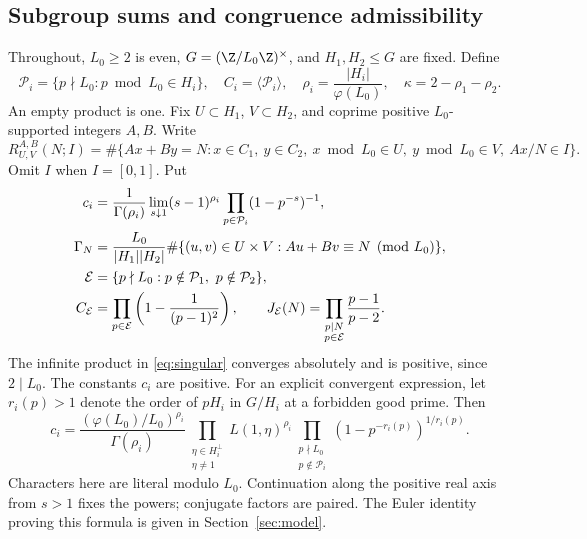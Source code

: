 \subsection{Subgroup sums and congruence admissibility}
Throughout, \(L_0\ge2\) is even,
\(G=(\Z/L_0\Z)^\times\), and \(H_1,H_2\le G\) are fixed.
Define
\[
 \mathcal P_i=\{p\nmid L_0:p\bmod L_0\in H_i\},\quad
 C_i=\langle\mathcal P_i\rangle,\quad
 \rho_i=\frac{|H_i|}{\varphi(L_0)},\quad
 \kappa=2-\rho_1-\rho_2.
\]
An empty product is one. Fix \(U\subset H_1\), \(V\subset H_2\),
and coprime positive \(L_0\)-supported integers \(A,B\).
Write
\[
 R_{U,V}^{A,B}(N;I)=\#\{Ax+By=N:x\in C_1,\ y\in C_2,
      \ x\bmod L_0\in U,\ y\bmod L_0\in V,\ Ax/N\in I\}.
\]
Omit \(I\) when \(I=[0,1]\). Put
\begin{align}
 c_i&=\frac{1}{\Gamma(\rho_i)}
    \lim_{s\downarrow1}(s-1)^{\rho_i}
              \prod_{p\in\mathcal P_i}(1-p^{-s})^{-1},\label{eq:marginal}\\
 \Gamma_N&=\frac{L_0}{|H_1||H_2|}
    \#\{(u,v)\in U\times V:Au+Bv\equiv N\pmod{L_0}\},\label{eq:finite}\\
 \mathcal E&=\{p\nmid L_0:p\notin\mathcal P_1,
                                  \ p\notin\mathcal P_2\},\notag\\
 C_{\mathcal E}&=\prod_{p\in\mathcal E}
               \left(1-\frac{1}{(p-1)^2}\right),\qquad
 J_{\mathcal E}(N)=\prod_{\substack{p\mid N\\p\in\mathcal E}}
                              \frac{p-1}{p-2}.\label{eq:singular}
\end{align}
The infinite product in \eqref{eq:singular} converges absolutely and
is positive, since \(2\mid L_0\). The constants \(c_i\) are positive.
For an explicit convergent expression, let \(r_i(p)>1\) denote the
order of \(pH_i\) in \(G/H_i\) at a forbidden good prime. Then
\begin{equation}\label{eq:marginal-product}
 c_i=\frac{(\varphi(L_0)/L_0)^{\rho_i}}{\Gamma(\rho_i)}
 \prod_{\substack{\eta\in H_i^\perp\\\eta\ne1}}L(1,\eta)^{\rho_i}
 \prod_{\substack{p\nmid L_0\\p\notin\mathcal P_i}}
                     (1-p^{-r_i(p)})^{1/r_i(p)}.
\end{equation}
Characters here are literal modulo \(L_0\). Continuation along the
positive real axis from \(s>1\) fixes the powers; conjugate factors
are paired. The Euler identity proving this formula is given in
Section~\ref{sec:model}.

